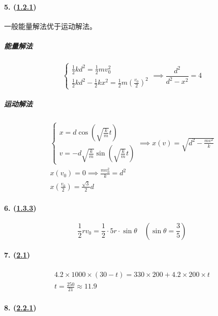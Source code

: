 \paragraph{5. (\hyperref[subsec:1.2.1]{1.2.1})} 一般能量解法优于运动解法。

\subparagraph{能量解法}

\begin{equation*}
    \begin{cases}
        \frac12kd^2=\frac12mv_0^2\\
        \frac12kd^2-\frac12kx^2=\frac12m\left(\frac{v_0}{2}\right)^2
    \end{cases}\implies
    \frac{d^2}{d^2-x^2}=4
\end{equation*}

\subparagraph{运动解法}

\begin{gather*}
    \begin{cases}
        x=d\cos\left(\sqrt{\frac{k}{m}}t\right)\\
        v=-d\sqrt{\frac{k}{m}}\sin\left(\sqrt{\frac{k}{m}}t\right)
    \end{cases}\implies
    x(v)=\sqrt{d^2-\frac{mv^2}{k}}\\
    x(v_0)=0\implies \frac{mv_0^2}{k}=d^2\\
    x\left(\frac{v_0}{2}\right)=\frac{\sqrt{3}}{2}d
\end{gather*}

\paragraph{6. (\hyperref[subsec:1.3.3]{1.3.3})}

\begin{equation*}
    \frac12rv_0=\frac12\cdot5r\cdot\sin\theta\quad\left(\sin\theta=\frac35\right)
\end{equation*}

\paragraph{7. (\hyperref[sec:2.1]{2.1})}

\begin{gather*}
    4.2\times1000\times(30-t)=330\times200+4.2\times200\times t\\
    t=\frac{250}{21}\approx11.9
\end{gather*}

\paragraph{8. (\hyperref[subsec:2.2.1]{2.2.1})}

